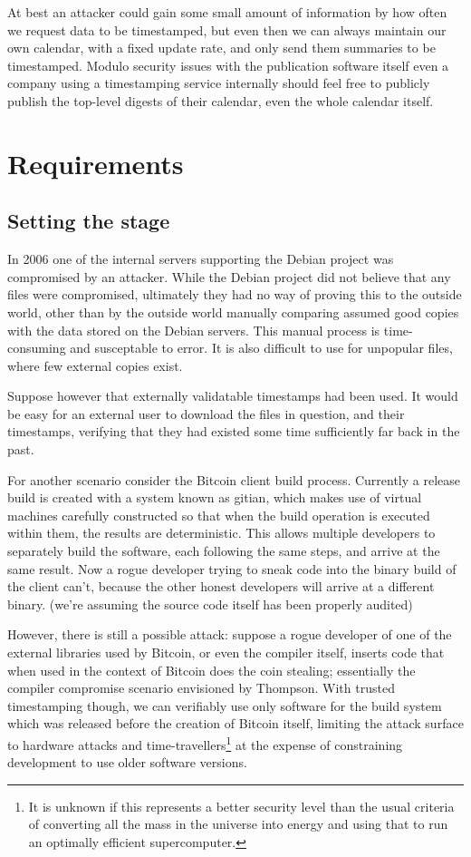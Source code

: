 \documentclass{article}
\begin{document}
At best an attacker could gain some small amount of information by how often we
request data to be timestamped, but even then we can always maintain our own
calendar, with a fixed update rate, and only send them summaries to be
timestamped. Modulo security issues with the publication software itself even a
company using a timestamping service internally should feel free to publicly
publish the top-level digests of their calendar, even the whole calendar
itself.

\section{Requirements}

\subsection{Setting the stage}

In 2006 one of the internal servers supporting the Debian project was
compromised by an attacker.\cite{debian_hack_press_release} While the Debian
project did not believe that any files were compromised, ultimately they had no
way of proving this to the outside world, other than by the outside world
manually comparing assumed good copies with the data stored on the Debian
servers. This manual process is time-consuming and susceptable to error. It is
also difficult to use for unpopular files, where few external copies exist.

Suppose however that externally validatable timestamps had been used. It would
be easy for an external user to download the files in question, and their
timestamps, verifying that they had existed some time sufficiently far back in
the past.

For another scenario consider the Bitcoin client build process. Currently a
release build is created with a system known as gitian, which makes use of
virtual machines carefully constructed so that when the build operation is
executed within them, the results are
deterministic.\cite{bitcoin_build_process} This allows multiple developers to
separately build the software, each following the same steps, and arrive at the
same result. Now a rogue developer trying to sneak code into the binary build
of the client can't, because the other honest developers will arrive at a
different binary. (we're assuming the source code itself has been properly
audited)

However, there is still a possible attack: suppose a rogue developer of one of
the external libraries used by Bitcoin, or even the compiler itself, inserts
code that when used in the context of Bitcoin does the coin stealing;
essentially the compiler compromise scenario envisioned by
Thompson.\cite{Thompson84reflectionson} With trusted timestamping though, we
can verifiably use only software for the build system which was released before
the creation of Bitcoin itself, limiting the attack surface to hardware attacks
and time-travellers\footnote{It is unknown if this represents a better security
level than the usual criteria of converting all the mass in the universe
into energy and using that to run an optimally efficient supercomputer.}
at the expense of constraining development to use older software versions.
\end{document}
